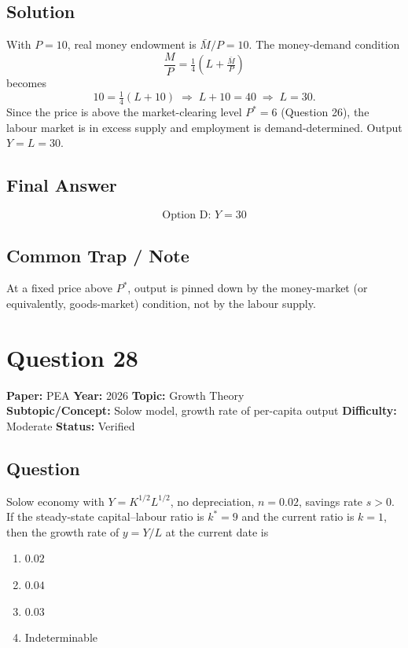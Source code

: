 \documentclass[11pt]{article}
\begin{document}
\subsection*{Solution}
With $P=10$, real money endowment is $\bar M/P = 10$. The money-demand
condition
\[
\frac{M}{P} = \tfrac{1}{4}\!\left(L + \tfrac{\bar M}{P}\right)
\]
becomes
\[
10 = \tfrac{1}{4}(L + 10) \;\Longrightarrow\; L + 10 = 40 \;\Longrightarrow\; L = 30.
\]
Since the price is above the market-clearing level $P^* = 6$ (Question 26), the
labour market is in excess supply and employment is demand-determined.
Output $Y = L = 30$.

\subsection*{Final Answer}
\[
\boxed{\text{Option D: } Y = 30}
\]

\subsection*{Common Trap / Note}
At a fixed price above $P^*$, output is pinned down by the money-market
(or equivalently, goods-market) condition, not by the labour supply.

\section*{Question 28}
\textbf{Paper:} PEA \quad \textbf{Year:} 2026 \quad \textbf{Topic:} Growth Theory \\
\textbf{Subtopic/Concept:} Solow model, growth rate of per-capita output \quad
\textbf{Difficulty:} Moderate \quad \textbf{Status:} Verified

\subsection*{Question}
Solow economy with $Y = K^{1/2} L^{1/2}$, no depreciation, $n = 0.02$, savings
rate $s > 0$. If the steady-state capital--labour ratio is $k^* = 9$ and the
current ratio is $k = 1$, then the growth rate of $y = Y/L$ at the current date
is
\begin{enumerate}[label=(\Alph*)]
\item $0.02$ \item $0.04$ \item $0.03$ \item Indeterminable
\end{enumerate}
\end{document}
